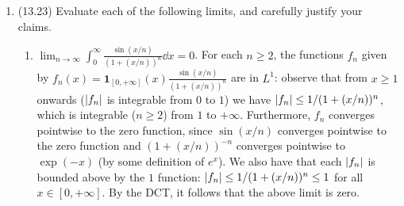 \documentclass[11pt]{article}
\newcommand{\cbr}[1]{\left\{#1\right\}}
\begin{document}
\begin{enumerate}
\begin{proof}
        Then with Tonelli's theorem (Corollary 10.6 in the notes) we have $\nu(E) = \int_E f \dd{\mu} = \int_X \mathbf{1}_E f\dd{\mu} = \int_X\sum_j \mathbf{1}_{E_j} f\dd{\mu} = \sum_j\int_X 1_{E_j}f \dd{\mu} = \sum_j \int_{E_j} f \dd{\mu} = \sum_j \nu(E_j)$ as desired. Hence $\nu$ is a measure.

        Since $g$ is an unsigned measurable function, we may approximate $g$ from below by an increasing sequence of simple unsigned measurable functions $s_n$; that is, there exists a sequence of simple unsigned measurable functions $(s_n)$ increasing to $g$ pointwise. By the monotone convergence theorem, $\lim_{n\to\infty} \int s_n\dd{\nu} = \int g\dd{\nu}$. But for any simple function $s = \sum_{j=0}^n c_j\mathbf{1}_{E_j}$ with $\cbr{E_j}$ a measurable partition of $X$, $c_j\geq 0$ and $0\leq s\leq g$, we have $\int_X s \dd{\nu} = \sum_{j=0}^n c_j\nu(E_j) = \sum_{j=0}^n c_j\int_{E_j} f\dd{\mu} = \int_X \sum_{j=0}^n c_j\mathbf{1}_{E_j}f\dd{\mu}= \int_X sf\dd{\mu}$. Hence $\lim_{n\to\infty}\int s_n f\dd{\mu} = \int g\dd{\nu}$.

        However, observe that $(s_nf)$ increases to $gf$ pointwise so that by using the MCT again we have $\lim_{n\to\infty}\int s_n f\dd{\mu} = \int gf \dd{\mu} = \int g\dd{\nu}$ as desired.
    \end{proof}
    \item (13.23) Evaluate each of the following limits, and carefully justify your claims.\begin{enumerate}
        \item $\displaystyle\lim_{n\to\infty}\int_0^\infty \frac{\sin(x/n)}{(1+(x/n))^n}\dd x = 0$. For each $n\geq 2$, the functions $f_n$ given by $f_n(x) = \mathbf{1}_{[0,+\infty]}(x)\frac{\sin(x/n)}{(1+(x/n))^n}$ are in $L^1$: observe that from $x\geq 1$ onwards ($\abs{f_n}$ is integrable from $0$ to $1$) we have $\abs{f_n}\leq 1/(1+(x/n))^n$, which is integrable ($n\geq 2$) from $1$ to $+\infty$. Furthermore, $f_n$ converges pointwise to the zero function, since $\sin(x/n)$ converges pointwise to the zero function and $(1+(x/n))^{-n}$ converges pointwise to $\exp(-x)$ (by some definition of $e^x$). We also have that each $\abs{f_n}$ is bounded above by the $1$ function: $\abs{f_n}\leq 1/(1+(x/n))^n\leq 1$ for all $x\in [0,+\infty]$. By the DCT, it follows that the above limit is zero.
        

\end{enumerate}
\end{enumerate}
\end{document}
